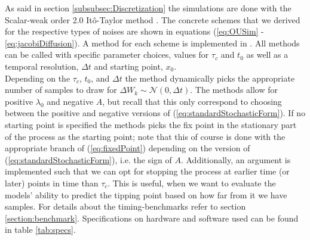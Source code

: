 As said in section \ref{subsubsec:Discretization} the simulations are done with the Scalar-weak order 2.0 Itô-Taylor method \cite[algorithm 8.5]{Srkk2019}. The concrete schemes that we derived for the respective types of noises are shown in equations (\ref{eq:OUSim} - \ref{eq:jacobiDiffusion}). A method for each scheme is implemented in . All methods can be called with specific parameter choices, values for $\tau_c$ and $t_0$ as well as a temporal resolution, $\Delta t$ and starting point, $x_0$. \\Depending on the $\tau_c$, $t_0$, and $\Delta t$ the method dynamically picks the appropriate number of samples to draw for $\Delta W_k\sim\mathcal{N}\left(0,\Delta t\right)$. The methods allow for positive $\lambda_0$ and negative $A$, but recall that this only correspond to choosing between the positive and negative versions of (\ref{eq:standardStochasticForm}). If no starting point is specified the methods picks the fix point in the stationary part of the process as the starting point; note that this of course is done with the appropriate branch of (\ref{eq:fixedPoint}) depending on the version of (\ref{eq:standardStochasticForm}), i.e. the sign of $A$. Additionally, an argument is implemented such that we can opt for stopping the process at earlier time (or later) points in time than $\tau_c$. This is useful, when we want to evaluate the models' ability to predict the tipping point based on how far from it we have samples. For details about the timing-benchmarks refer to section \ref{section:benchmark}. Specifications on hardware and software used can be found in table \ref{tab:specs}. 
